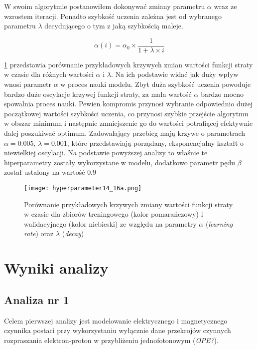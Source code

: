 \documentclass[11pt]{book}
\theoremstyle{definition}
\begin{document}
W swoim algorytmie postanowiłem dokonywać zmiany parametru $\alpha$ wraz ze wzrostem iteracji. Ponadto szybkość uczenia zależna jest od wybranego parametru $\lambda$ decydującego o tym z jaką szybkością maleje.

\begin{equation}
\alpha(i) = \alpha_0 \times \frac{1}{1 + \lambda \times i}
\end{equation}

\figurename{} \ref{fig:hyperparameters} przedstawia porównanie przykładowych krzywych zmian wartości funkcji straty w czasie dla różnych wartości $\alpha$ i $\lambda$. Na ich podstawie widać jak duży wpływ wnosi parametr $\alpha$ w proces nauki modelu. Zbyt duża szybkość uczenia powoduje bardzo duże oscylacje krzywej funkcji straty, za mała wartość $\alpha$ bardzo mocno spowalnia proces nauki. Pewien kompromis przynosi wybranie odpowiednio dużej początkowej wartości szybkości uczenia, co przynosi szybkie przejście algorytmu w obszar minimum i następnie zmniejszenie go do wartości potrafiącej efektywnie dalej poszukiwać optimum. Zadowalający przebieg mają krzywe o parametrach $\alpha = 0.005$, $\lambda = 0.001$, które przedstawiają porządany, eksponencjalny kształt o niewielkiej oscylacji. Na podstawie powyższej analizy to właśnie te hiperparametry zostały wykorzystane w modelu, dodatkowo parametr pędu $\beta$ został ustalony na wartość $0.9$


\begin{figure}[htp!]
	\centering
	\texttt{[image: hyperparameter14\_16a.png]}
	\caption{Porównanie przykładowych krzywych zmiany wartości funkcji straty w czasie dla zbiorów treningowego (kolor pomarańczowy) i walidacyjnego (kolor niebieski) ze względu na parametry $\alpha$ (\textit{learning rate}) oraz $\lambda$ (\textit{decay})}
	\label{fig:hyperparameters}
\end{figure}


\chapter{Wyniki analizy}

\section{Analiza nr 1}


Celem pierwszej analizy jest modelowanie elektrycznego i magnetycznego czynnika postaci przy wykorzystaniu wyłącznie dane przekrojów czynnych rozpraszania elektron-proton w przybliżeniu jednofotonowym (\textit{OPE?}).
\end{document}

